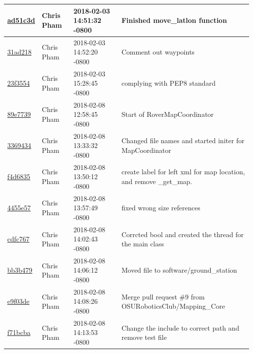 \begin{center}
\begin{tabular}{l l l l}
\href{https://github.com/OSURoboticsClub/Rover_2017_2018/commit/ad51c3d7940eb1c5baa8f4ac0b72fe115c7eb776}{ad51c3d} & Chris Pham & 2018-02-03 14:51:32 -0800 &Finished move\_latlon function\\\hline
\href{https://github.com/OSURoboticsClub/Rover_2017_2018/commit/31ad2185cb708d66cdb29dc23597a8c241622b4f}{31ad218} & Chris Pham & 2018-02-03 14:52:20 -0800 &Comment out waypoints\\\hline
\href{https://github.com/OSURoboticsClub/Rover_2017_2018/commit/23f3554af37f18f17b1ad9c79378f5fc185ebf1a}{23f3554} & Chris Pham & 2018-02-03 15:28:45 -0800 &complying with PEP8 standard\\\hline
\href{https://github.com/OSURoboticsClub/Rover_2017_2018/commit/89e7739f54adcf9317261f4741d1860d9c41a838}{89e7739} & Chris Pham & 2018-02-08 12:58:45 -0800 &Start of RoverMapCoordinator\\\hline
\href{https://github.com/OSURoboticsClub/Rover_2017_2018/commit/33694343176eaedff94334df4083b831ce1bc006}{3369434} & Chris Pham & 2018-02-08 13:33:32 -0800 &Changed file names and started initer for MapCoordinator\\\hline
\href{https://github.com/OSURoboticsClub/Rover_2017_2018/commit/f4d6835e85304f1dd43cea14ac4eb17587b14606}{f4d6835} & Chris Pham & 2018-02-08 13:50:12 -0800 &create label for left xml for map location, and remove \_get\_map.\\\hline
\href{https://github.com/OSURoboticsClub/Rover_2017_2018/commit/4455e5769389aa18ea396a3981cf3a3b989c6271}{4455e57} & Chris Pham & 2018-02-08 13:57:49 -0800 &fixed wrong size references\\\hline
\href{https://github.com/OSURoboticsClub/Rover_2017_2018/commit/cdfc76789173155e7f6fdc8d27137149e6f41fc6}{cdfc767} & Chris Pham & 2018-02-08 14:02:43 -0800 &Corrcted bool and created the thread for the main class\\\hline
\href{https://github.com/OSURoboticsClub/Rover_2017_2018/commit/bb3b47977b1818ff9d45c6144d134e6a34a7d316}{bb3b479} & Chris Pham & 2018-02-08 14:06:12 -0800 &Moved file to software/ground\_station\\\hline
\href{https://github.com/OSURoboticsClub/Rover_2017_2018/commit/e9f03deaa25624aeec6509c72e782cc801fef521}{e9f03de} & Chris Pham & 2018-02-08 14:08:26 -0800 &Merge pull request \#9 from OSURoboticsClub/Mapping\_Core\\\hline
\href{https://github.com/OSURoboticsClub/Rover_2017_2018/commit/f71bcba2b080bbc51f9d5eda2f2ae3010d332f68}{f71bcba} & Chris Pham & 2018-02-08 14:13:53 -0800 &Change the include to correct path and remove test file\\\hline

\end{tabular}
\end{center}
